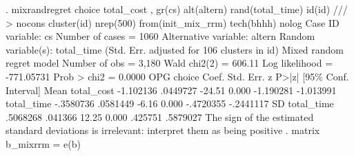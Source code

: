 . mixrandregret choice  total_cost , gr(cs) alt(altern) rand(total_time) id(id) ///
> nocons cluster(id)  nrep(500) from(init_mix_rrm) tech(bhhh)  nolog
{\smallskip}
Case ID variable: cs                           Number of cases    =       1060
Alternative variable: altern                   
Random variable(s): total_time                 
{\smallskip}
                                 (Std. Err. adjusted for  106 clusters in id)
{\smallskip}
Mixed random regret model                       Number of obs     =      3,180
                                                Wald chi2(2)      =     606.11
Log likelihood = -771.05731                     Prob > chi2       =     0.0000
{\smallskip}
             {\VBAR}                 OPG
      choice {\VBAR}      Coef.   Std. Err.      z    P>|z|     [95\% Conf. Interval]
Mean         {\VBAR}
  total_cost {\VBAR}  -1.102136   .0449727   -24.51   0.000    -1.190281   -1.013991
  total_time {\VBAR}  -.3580736   .0581449    -6.16   0.000    -.4720355   -.2441117
SD           {\VBAR}
  total_time {\VBAR}   .5068268    .041366    12.25   0.000      .425751    .5879027
{\smallskip}
The sign of the estimated standard deviations is irrelevant: interpret them as
being positive
{\smallskip}
. matrix b_mixrrm = e(b)
{\smallskip}
